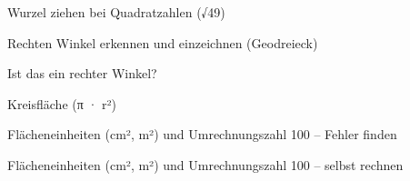 \begin{aufgabe}{Wurzel ziehen bei Quadratzahlen (√49)}
\end{aufgabe}

\begin{aufgabe}{Rechten Winkel erkennen und einzeichnen (Geodreieck)}
\begin{teile}
\teil Ist das ein rechter Winkel? \janein
\end{teile}
\end{aufgabe}

\begin{aufgabe}{Kreisfläche (π · r²)}
\end{aufgabe}

\begin{aufgabe}{Flächeneinheiten (cm², m²) und Umrechnungszahl 100 – Fehler finden}
\end{aufgabe}

\begin{aufgabe}{Flächeneinheiten (cm², m²) und Umrechnungszahl 100 – selbst rechnen}
\end{aufgabe}
